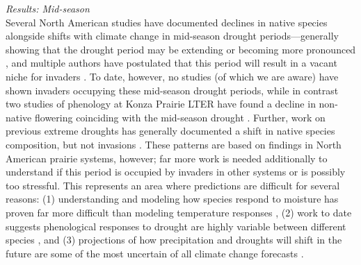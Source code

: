\documentclass[11pt,a4paper,oneside]{article}
\begin{document}
\noindent \emph{Results: Mid-season}\\
\noindent  Several North American studies have documented declines in native species alongside shifts with climate change in mid-season drought periods---generally showing that the drought period may be extending or becoming more pronounced \citep{Aldridge:2011}, and multiple authors have postulated that this period will result in a vacant niche for invaders \citep{Sherry:2007fq,Aldridge:2011}. To date, however, no studies (of which we are aware) have shown invaders occupying these mid-season drought periods, while in contrast two studies of phenology at Konza Prairie LTER have found a decline in non-native flowering coinciding with the mid-season drought \citep{Craine:2012kl,wolkovichAmBot2013}. Further, work on previous extreme droughts has generally documented a shift in native species composition, but not invasions \citep{Weaver1936}. These patterns are based on findings in North American prairie systems, however; far more work is needed additionally to understand if this period is occupied by invaders in other systems or is possibly too stressful. This represents an area where predictions are difficult for several reasons: (1) understanding and modeling how species respond to moisture has proven far more difficult than modeling temperature responses \citep{Crimmins:2011lq,wolkovichAmBot2013}, (2) work to date suggests phenological responses to drought are highly variable between different species \citep{Jentsch:2009ff,Prieto:2009fu}, and (3) projections of how precipitation and droughts will shift in the future are some of the most uncertain of all climate change forecasts \citep{knutti2013}. 
\\
\end{document}
